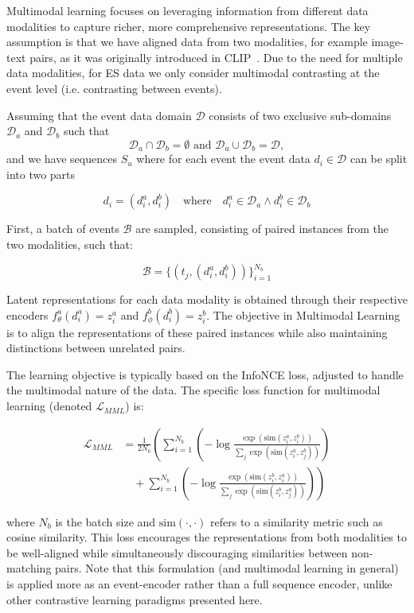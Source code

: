 Multimodal learning focuses on leveraging information from different data modalities to capture richer, more comprehensive representations. 
The key assumption is that we have aligned data from two modalities, for example image-text pairs, as it was originally introduced in CLIP~\cite{radford2021learning}.
Due to the need for multiple data modalities, for ES data we only consider multimodal contrasting at the event level (i.e. contrasting between events).

Assuming that the event data domain $\mathcal{D}$ consists of two exclusive sub-domains
$\mathcal{D}_a$ and $\mathcal{D}_b$ such that
$$\mathcal{D}_a \cap \mathcal{D}_b = \emptyset \text{ and } \mathcal{D}_a \cup \mathcal{D}_b = \mathcal{D},$$
and we have sequences $S_u$ where for each event the event data $d_i \in \mathcal{D}$ can be split into two parts 

$$d_i = (d_i^a, d_i^b) \quad \text{where} \quad d_i^a \in \mathcal{D}_a \wedge d_i^b \in \mathcal{D}_b$$

First, a batch of events $\mathcal{B}$ are sampled,  consisting of paired instances from the two modalities, such that:

$$
\mathcal{B} = \{(t_j, (d^a_i, d^b_i))\}_{i=1}^{N_b}
$$

Latent representations for each data modality is obtained through their respective encoders $f_\theta^a(d_i^a) = z_i^a$ and $ f_\phi^b(d_i^b) = z_i^b$.
The objective in Multimodal Learning is to align the representations of these paired instances while also maintaining distinctions between unrelated pairs.

The learning objective is typically based on the InfoNCE loss, adjusted to handle the multimodal nature of the data. 
The specific loss function for multimodal learning (denoted $\mathcal{L}_{MML}$) is:

\begin{align*}
\mathcal{L}_{MML} &= \frac{1}{2N_b} \left( \sum_{i=1}^{N_b} \left( - \log \frac{\exp(\text{sim}(z^a_i, z^b_i))}{\sum_{j} \exp(\text{sim}(z^a_i, z^b_j))} \right) \right. \\
&\quad + \left. \sum_{i=1}^{N_b} \left( - \log \frac{\exp(\text{sim}(z^b_i, z^a_i))}{\sum_{j} \exp(\text{sim}(z^b_i, z^a_j))} \right) \right)
\end{align*}

where $N_b$ is the batch size and $\text{sim}(\cdot, \cdot)$ refers to a similarity metric such as cosine similarity.
This loss encourages the representations from both modalities to be well-aligned while simultaneously discouraging similarities between non-matching pairs.
Note that this formulation (and multimodal learning in general) is applied more as an event-encoder rather than a full sequence encoder, unlike other contrastive learning paradigms presented here.